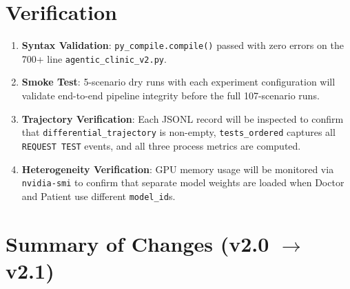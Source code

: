 \documentclass[12pt, a4paper]{article}
\begin{document}
\section{Verification}
\label{sec:verification}

\begin{enumerate}
    \item \textbf{Syntax Validation}: \texttt{py\_compile.compile()} passed
    with zero errors on the 700+ line \texttt{agentic\_clinic\_v2.py}.

    \item \textbf{Smoke Test}: 5-scenario dry runs with each experiment
    configuration will validate end-to-end pipeline integrity before the
    full 107-scenario runs.

    \item \textbf{Trajectory Verification}: Each JSONL record will be
    inspected to confirm that \texttt{differential\_trajectory} is non-empty,
    \texttt{tests\_ordered} captures all \texttt{REQUEST TEST} events, and
    all three process metrics are computed.

    \item \textbf{Heterogeneity Verification}: GPU memory usage will be
    monitored via \texttt{nvidia-smi} to confirm that separate model weights
    are loaded when Doctor and Patient use different \texttt{model\_id}s.
\end{enumerate}

\section{Summary of Changes (v2.0 $\rightarrow$ v2.1)}
\label{sec:changelog}
\end{document}
